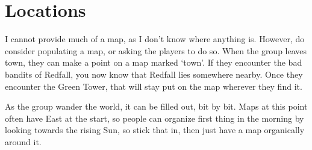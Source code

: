 \chapter{Locations}

I cannot provide much of a map, as I don't know where anything is.
However, do consider populating a map, or asking the players to do so.
When the group leaves \gls{town}, they can make a point on a map marked `town'.
If they encounter the bad bandits of Redfall, you now know that Redfall lies somewhere nearby.
Once they encounter the Green Tower, that will stay put on the map wherever they find it.

As the group wander the world, it can be filled out, bit by bit.
Maps at this point often have East at the start, so people can organize first thing in the morning by looking towards the rising Sun, so stick that in, then just have a map organically around it.




